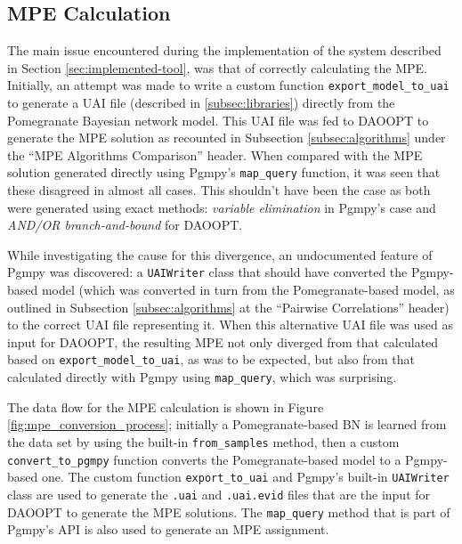 \subsection{MPE Calculation} \label{subsec:results-mpe-calculation-issues}
The main issue encountered during the implementation of the system described in Section \ref{sec:implemented-tool}, was that of correctly calculating the MPE.
Initially, an attempt was made to write a custom function \texttt{export\_model\_to\_uai} to generate a UAI file (described in \ref{subsec:libraries}) directly from the Pomegranate Bayesian network model.
This UAI file was fed to DAOOPT to generate the MPE solution as recounted in Subsection \ref{subsec:algorithms} under the \enquote{MPE Algorithms Comparison} header.
When compared with the MPE solution generated directly using Pgmpy's \texttt{map\_query} function, it was seen that these disagreed in almost all cases.
This shouldn't have been the case as both were generated using exact methods: \textit{variable elimination} in Pgmpy's case and \textit{AND/OR branch-and-bound} for DAOOPT.

While investigating the cause for this divergence, an undocumented feature of Pgmpy was discovered: a \texttt{UAIWriter} class that should have converted the Pgmpy-based model (which was converted in turn from the Pomegranate-based model, as outlined in Subsection \ref{subsec:algorithms} at the \enquote{Pairwise Correlations} header) to the correct UAI file representing it.
When this alternative UAI file was used as input for DAOOPT, the resulting MPE not only diverged from that calculated based on \texttt{export\_model\_to\_uai}, as was to be expected, but also from that calculated directly with Pgmpy using \texttt{map\_query}, which was surprising.

The data flow for the MPE calculation is shown in Figure \ref{fig:mpe_conversion_process}; initially a Pomegranate-based BN is learned from the data set by using the built-in \texttt{from\_samples} method, then a custom \texttt{convert\_to\_pgmpy} function converts the Pomegranate-based model to a Pgmpy-based one.
The custom function \texttt{export\_to\_uai} and Pgmpy's built-in \texttt{UAIWriter} class are used to generate the \texttt{.uai} and \texttt{.uai.evid} files that are the input for DAOOPT to generate the MPE solutions.
The \texttt{map\_query} method that is part of Pgmpy's API is also used to generate an MPE assignment.

